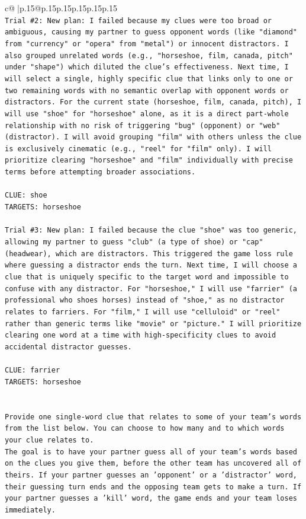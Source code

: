 \documentclass{article}
\begin{document}
{\begin{supertabular}{c@{$\;$}|p{.15\linewidth}@{}p{.15\linewidth}p{.15\linewidth}p{.15\linewidth}p{.15\linewidth}p{.15\linewidth}}
{{{\\ 
\texttt{Trial \#2: New plan: I failed because my clues were too broad or ambiguous, causing my partner to guess opponent words (like "diamond" from "currency" or "opera" from "metal") or innocent distractors. I also grouped unrelated words (e.g., "horseshoe, film, canada, pitch" under "shape") which diluted the clue's effectiveness. Next time, I will select a single, highly specific clue that links only to one or two remaining words with no semantic overlap with opponent words or distractors. For the current state (horseshoe, film, canada, pitch), I will use "shoe" for "horseshoe" alone, as it is a direct part{-}whole relationship with no risk of triggering "bug" (opponent) or "web" (distractor). I will avoid grouping "film" with others unless the clue is exclusively cinematic (e.g., "reel" for "film" only). I will prioritize clearing "horseshoe" and "film" individually with precise terms before attempting broader associations.} \\
\\ 
\texttt{CLUE: shoe} \\
\texttt{TARGETS: horseshoe} \\
\\ 
\texttt{Trial \#3: New plan: I failed because the clue "shoe" was too generic, allowing my partner to guess "club" (a type of shoe) or "cap" (headwear), which are distractors. This triggered the game loss rule where guessing a distractor ends the turn. Next time, I will choose a clue that is uniquely specific to the target word and impossible to confuse with any distractor. For "horseshoe," I will use "farrier" (a professional who shoes horses) instead of "shoe," as no distractor relates to farriers. For "film," I will use "celluloid" or "reel" rather than generic terms like "movie" or "picture." I will prioritize clearing one word at a time with high{-}specificity clues to avoid accidental distractor guesses.} \\
\\ 
\texttt{CLUE: farrier} \\
\texttt{TARGETS: horseshoe} \\
\\ 
\\ 
\texttt{Provide one single{-}word clue that relates to some of your team's words from the list below. You can choose to how many and to which words your clue relates to.} \\
\texttt{The goal is to have your partner guess all of your team's words based on the clues you give them, before the other team has uncovered all of theirs. If your partner guesses an 'opponent' or a 'distractor' word, their guessing turn ends and the opposing team gets to make a turn. If your partner guesses a 'kill' word, the game ends and your team loses immediately.} \\
}}}
\end{supertabular}}
\end{document}
